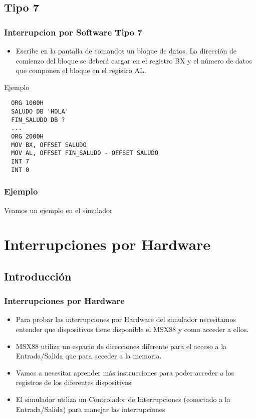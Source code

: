 \documentclass{beamer}
\begin{document}
\subsection{Tipo 7}
\begin{frame}[fragile]
\frametitle{Interrupcion por Software Tipo 7}
\begin{itemize}
 \item Escribe en la pantalla de comandos un bloque de datos. La dirección de comienzo del bloque se deberá cargar en el registro BX y el número de datos que componen el bloque en el registro AL.
\end{itemize}
\begin{block}{Ejemplo}
\begin{verbatim}
  ORG 1000H
  SALUDO DB 'HOLA'
  FIN_SALUDO DB ?
  ...
  ORG 2000H
  MOV BX, OFFSET SALUDO
  MOV AL, OFFSET FIN_SALUDO - OFFSET SALUDO
  INT 7
  INT 0
\end{verbatim}
\end{block}

\end{frame}

\begin{frame}
\frametitle{Ejemplo}
\begin{block}{}
Veamos un ejemplo en el simulador
\end{block}
\end{frame}

\section{Interrupciones por Hardware}
\subsection{Introducción}
\begin{frame}
\frametitle{Interrupciones por Hardware}
\begin{itemize}
 \item Para probar las interrupciones por Hardware del simulador necesitamos entender que dispositivos tiene disponible el MSX88 y como acceder a ellos. 
 \item MSX88 utiliza un espacio de direcciones diferente para el acceso a la Entrada/Salida que para acceder a la memoria.
 \item Vamos a necesitar aprender más instrucciones para poder acceder a los registros de los diferentes dispositivos.
 \item El simulador utiliza un Controlador de Interrupciones (conectado a la Entrada/Salida) para manejar las interrupciones
\end{itemize}
\end{frame}
\end{document}
